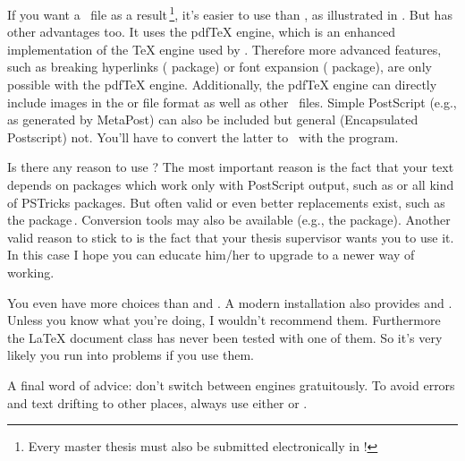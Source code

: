 If you want a \PDF\ file as a result\,\footnote{Every master thesis must
  also be submitted electronically in \PDF!}, it's easier to use
 than , as illustrated in .
But  has other advantages too. It uses the pdfTeX engine,
which is an enhanced implementation of the TeX engine used by .
Therefore more advanced features, such as breaking hyperlinks
( package) or font expansion ( package), are
only possible with the pdfTeX engine. Additionally, the pdfTeX engine can
directly include images in the  or  file format as
well as other \PDF\ files. Simple PostScript (e.g., as generated by
MetaPost) can also be included but general  (Encapsulated
Postscript) not. You'll have to convert the latter to \PDF\ with the
 program.

Is there any reason to use ? The most important reason is the
fact that your text depends on packages which work only with PostScript
output, such as  or all kind of PSTricks packages. But often
valid or even better replacements exist, such as the 
package\,\cite{pkg:pgf}. Conversion tools may also be available (e.g., the
 package).
Another valid reason to stick to  is the fact that your
thesis supervisor wants you to use it. In this case I hope you can educate
him/her to upgrade to a newer way of working.

You even have more choices than  and . A modern
installation also provides  and . Unless you
know what you're doing, I wouldn't recommend them. Furthermore the LaTeX
document class  has never been tested with one of them. So it's
very likely you run into problems if you use them.

A final word of advice: don't switch between engines gratuitously. To avoid
errors and text drifting to other places, always use either  or
.



